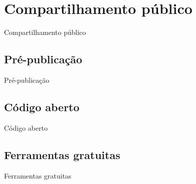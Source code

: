 \section{Compartilhamento público}
\label{s.public_sharing}

\begin{frame}{Compartilhamento público}
\end{frame}

\subsection{Pré-publicação}
\label{ss.research}

\begin{frame}{Pré-publicação}
\end{frame}

\subsection{Código aberto}
\label{ss.integrity}

\begin{frame}{Código aberto}
\end{frame}

\subsection{Ferramentas gratuitas}
\label{ss.free_tools}

\begin{frame}{Ferramentas gratuitas}
\end{frame}
